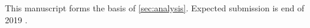 This manuscript forms the basis of \ref{sec:analysis}. Expected submission is end of 2019 \cite{Denker_elephant_2019}.




